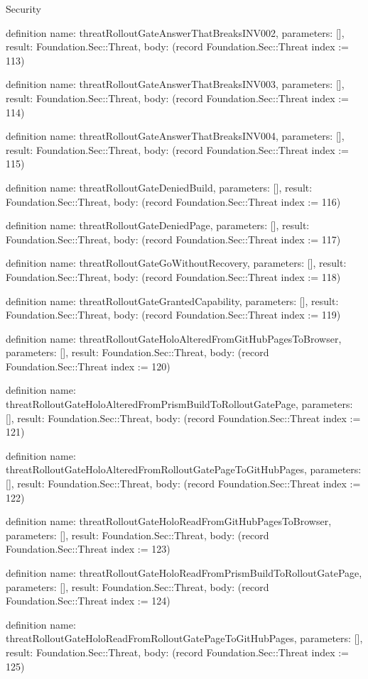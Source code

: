 \begin{lexlean}{Security}
\begin{semanticmodule}
definition{
  name: threatRolloutGateAnswerThatBreaksINV002,
  parameters: [],
  result: Foundation.Sec::Threat,
  body: (record Foundation.Sec::Threat {index := 113})
}

definition{
  name: threatRolloutGateAnswerThatBreaksINV003,
  parameters: [],
  result: Foundation.Sec::Threat,
  body: (record Foundation.Sec::Threat {index := 114})
}

definition{
  name: threatRolloutGateAnswerThatBreaksINV004,
  parameters: [],
  result: Foundation.Sec::Threat,
  body: (record Foundation.Sec::Threat {index := 115})
}

definition{
  name: threatRolloutGateDeniedBuild,
  parameters: [],
  result: Foundation.Sec::Threat,
  body: (record Foundation.Sec::Threat {index := 116})
}

definition{
  name: threatRolloutGateDeniedPage,
  parameters: [],
  result: Foundation.Sec::Threat,
  body: (record Foundation.Sec::Threat {index := 117})
}

definition{
  name: threatRolloutGateGoWithoutRecovery,
  parameters: [],
  result: Foundation.Sec::Threat,
  body: (record Foundation.Sec::Threat {index := 118})
}

definition{
  name: threatRolloutGateGrantedCapability,
  parameters: [],
  result: Foundation.Sec::Threat,
  body: (record Foundation.Sec::Threat {index := 119})
}

definition{
  name: threatRolloutGateHoloAlteredFromGitHubPagesToBrowser,
  parameters: [],
  result: Foundation.Sec::Threat,
  body: (record Foundation.Sec::Threat {index := 120})
}

definition{
  name: threatRolloutGateHoloAlteredFromPrismBuildToRolloutGatePage,
  parameters: [],
  result: Foundation.Sec::Threat,
  body: (record Foundation.Sec::Threat {index := 121})
}

definition{
  name: threatRolloutGateHoloAlteredFromRolloutGatePageToGitHubPages,
  parameters: [],
  result: Foundation.Sec::Threat,
  body: (record Foundation.Sec::Threat {index := 122})
}

definition{
  name: threatRolloutGateHoloReadFromGitHubPagesToBrowser,
  parameters: [],
  result: Foundation.Sec::Threat,
  body: (record Foundation.Sec::Threat {index := 123})
}

definition{
  name: threatRolloutGateHoloReadFromPrismBuildToRolloutGatePage,
  parameters: [],
  result: Foundation.Sec::Threat,
  body: (record Foundation.Sec::Threat {index := 124})
}

definition{
  name: threatRolloutGateHoloReadFromRolloutGatePageToGitHubPages,
  parameters: [],
  result: Foundation.Sec::Threat,
  body: (record Foundation.Sec::Threat {index := 125})
}


\end{semanticmodule}
\end{lexlean}

